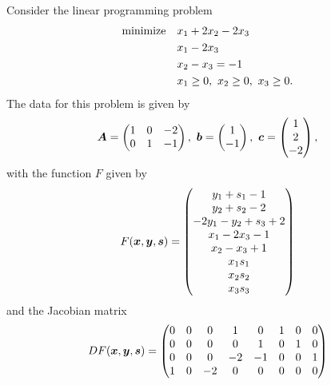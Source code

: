  \begin{example}
  Consider the linear programming problem
  \begin{align*}
   \text{minimize}\quad & x_1+2x_2-2x_3\\
   & x_1-2x_3\\
   & x_2-x_3=-1\\
   & x_1\geq 0, \ x_2\geq 0, \ x_3\geq 0.
  \end{align*}
The data for this problem is given by
\begin{equation*}
 \mtx{A} = \begin{pmatrix} 1 & 0 & -2\\ 0 & 1 & -1\end{pmatrix}, \ 
 \vct{b} = \begin{pmatrix} 1 \\ -1 \end{pmatrix}, \ 
 \vct{c} = \begin{pmatrix} 1 \\ 2 \\ -2 \end{pmatrix},
\end{equation*}
with the function $F$ given by
\begin{equation*}
 F(\bm{x},\bm{y},\bm{s}) = \begin{pmatrix}
                               y_1+s_1-1\\
                               y_2+s_2-2\\
                               -2y_1-y_2+s_3+2\\
                               x_1-2x_3-1\\
                               x_2-x_3+1\\
                               x_1s_1\\
                               x_2s_2\\
                               x_3s_3
                              \end{pmatrix}
\end{equation*}
and the Jacobian matrix
\begin{equation*}
 DF(\bm{x},\bm{y},\bm{s}) = \begin{pmatrix}
                                0 & 0 & 0 & 1 & 0 & 1 & 0 & 0\\
                                0 & 0 & 0 & 0 & 1 & 0 & 1 & 0\\
                                0 & 0 & 0 & -2 & -1 & 0 & 0 & 1\\
                                1 & 0 & -2 & 0 & 0 & 0 & 0 & 0 \\

\end{pmatrix}
\end{equation*}
\end{example}
